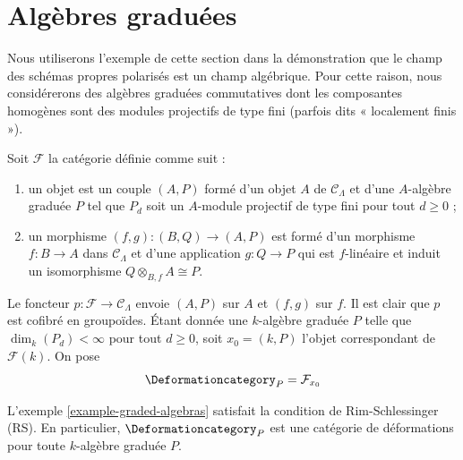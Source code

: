 \section{Algèbres graduées}
\label{section-graded-algebras}

\noindent
Nous utiliserons l'exemple de cette section dans la démonstration que le champ des
schémas propres polarisés est un champ algébrique. Pour cette raison, nous
considérerons des algèbres graduées commutatives dont les composantes homogènes sont
des modules projectifs de type fini (parfois dits « localement finis »).

\begin{example}
\label{example-graded-algebras}
Soit $\mathcal{F}$ la catégorie définie comme suit :
\begin{enumerate}
\item un objet est un couple $(A, P)$ formé d'un
objet $A$ de $\mathcal{C}_\Lambda$ et d'une $A$-algèbre graduée $P$
tel que $P_d$ soit un $A$-module projectif de type fini pour tout $d \geq 0$ ;
\item un morphisme $(f, g) : (B, Q) \to (A, P)$ est formé d'un
morphisme $f : B \to A$ dans $\mathcal{C}_\Lambda$ et
d'une application $g : Q \to P$ qui est $f$-linéaire et induit un
isomorphisme $Q \otimes_{B, f} A \cong P$.
\end{enumerate}
Le foncteur $p : \mathcal{F} \to \mathcal{C}_\Lambda$ envoie $(A, P)$
sur $A$ et $(f, g)$ sur $f$. Il est clair que $p$ est cofibré en groupoïdes.
Étant donnée une $k$-algèbre graduée $P$ telle que $\dim_k(P_d) < \infty$ pour tout
$d \geq 0$, soit $x_0 = (k, P)$ l'objet correspondant de $\mathcal{F}(k)$.
On pose
$$
\Deformationcategory_P = \mathcal{F}_{x_0}
$$
\end{example}

\begin{lemma}
\label{lemma-graded-algebras-RS}
L'exemple \ref{example-graded-algebras}
satisfait la condition de Rim-Schlessinger (RS).
En particulier, $\Deformationcategory_P$ est une catégorie de déformations
pour toute $k$-algèbre graduée $P$.
\end{lemma}

